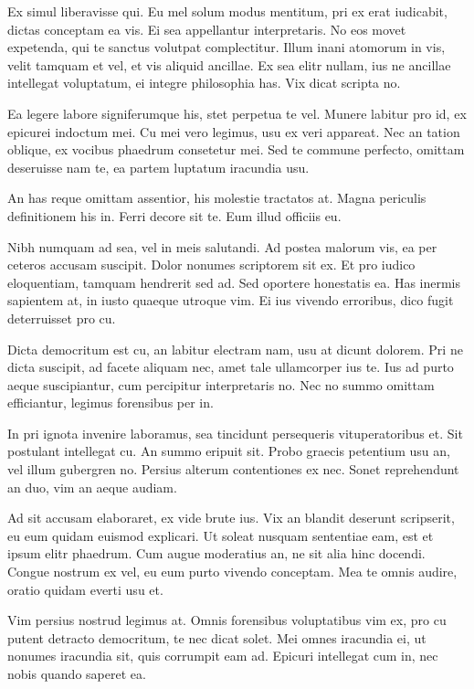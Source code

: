 \documentclass[twocolumn,twoside]{IEEEtran}
\begin{document}
 Ex simul liberavisse qui. Eu mel solum modus mentitum, pri ex erat iudicabit,
 dictas conceptam ea vis. Ei sea appellantur interpretaris. No eos movet
 expetenda, qui te sanctus volutpat complectitur. Illum inani atomorum in vis,
 velit tamquam et vel, et vis aliquid ancillae. Ex sea elitr nullam, ius ne
 ancillae intellegat voluptatum, ei integre philosophia has. Vix dicat scripta
 no.

 Ea legere labore signiferumque his, stet perpetua te vel. Munere labitur pro
 id, ex epicurei indoctum mei. Cu mei vero legimus, usu ex veri appareat. Nec
 an tation oblique, ex vocibus phaedrum consetetur mei. Sed te commune
 perfecto, omittam deseruisse nam te, ea partem luptatum iracundia usu.

 An has reque omittam assentior, his molestie tractatos at. Magna periculis
 definitionem his in. Ferri decore sit te. Eum illud officiis eu.

 Nibh numquam ad sea, vel in meis salutandi. Ad postea malorum vis, ea per
 ceteros accusam suscipit. Dolor nonumes scriptorem sit ex. Et pro iudico
 eloquentiam, tamquam hendrerit sed ad. Sed oportere honestatis ea. Has inermis
 sapientem at, in iusto quaeque utroque vim. Ei ius vivendo erroribus, dico
 fugit deterruisset pro cu.

 Dicta democritum est cu, an labitur electram nam, usu at dicunt dolorem. Pri
 ne dicta suscipit, ad facete aliquam nec, amet tale ullamcorper ius te. Ius ad
 purto aeque suscipiantur, cum percipitur interpretaris no. Nec no summo
 omittam efficiantur, legimus forensibus per in.

 In pri ignota invenire laboramus, sea tincidunt persequeris vituperatoribus
 et. Sit postulant intellegat cu. An summo eripuit sit. Probo graecis petentium
 usu an, vel illum gubergren no. Persius alterum contentiones ex nec. Sonet
 reprehendunt an duo, vim an aeque audiam.

 Ad sit accusam elaboraret, ex vide brute ius. Vix an blandit deserunt
 scripserit, eu eum quidam euismod explicari. Ut soleat nusquam sententiae eam,
 est et ipsum elitr phaedrum. Cum augue moderatius an, ne sit alia hinc
 docendi. Congue nostrum ex vel, eu eum purto vivendo conceptam. Mea te omnis
 audire, oratio quidam everti usu et.

 Vim persius nostrud legimus at. Omnis forensibus voluptatibus vim ex, pro cu
 putent detracto democritum, te nec dicat solet. Mei omnes iracundia ei, ut
 nonumes iracundia sit, quis corrumpit eam ad. Epicuri intellegat cum in, nec
 nobis quando saperet ea.
\end{document}
